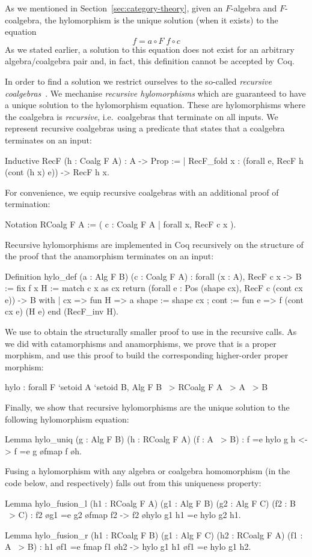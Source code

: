 \documentclass[a4paper,UKenglish,cleveref, autoref, thm-restate]{lipics-v2021}
\begin{document}
As we mentioned in Section~\ref{sec:category-theory}, given an $F$-algebra and
$F$-coalgebra, the hylomorphism is the unique solution (when it exists) to the
equation
\[
  f = a \circ F\; f \circ c
\]
As we stated earlier, a solution to this equation does not exist for an
arbitrary  algebra/coalgebra pair and, in fact, this definition cannot be
accepted by Coq.

In order to find a solution we restrict ourselves to the so-called
\emph{recursive coalgebras}~\cite{AdamekMM19,CaprettaUV04}.  We mechanise
\emph{recursive hylomorphisms} which are guaranteed to have a unique solution to
the hylomorphism equation. These are hylomorphisms where the coalgebra is
\emph{recursive}, i.e.\ coalgebras that terminate on all inputs. We represent
recursive coalgebras using a predicate that states that a coalgebra terminates
on an input:
\begin{coqcode}
Inductive RecF (h : Coalg F A) : A -> Prop :=
| RecF_fold x : (forall e, RecF h (cont (h x) e)) -> RecF h x.
\end{coqcode}
For convenience, we equip recursive coalgebras with an additional proof of termination:
\begin{coqcode}
Notation RCoalg F A := ({ c : Coalg F A | forall x, RecF c x }).
\end{coqcode}
Recursive hylomorphisms are implemented in Coq recursively on the structure of
the proof that the anamorphism terminates on an input:
\begin{coqcode}
Definition hylo_def (a : Alg F B) (c : Coalg F A) : forall (x : A), RecF c x -> B
  := fix f x H
     := match c x as cx return (forall e : Pos (shape cx), RecF c (cont cx e)) -> B with
        | cx => fun H => a { shape := shape cx ; cont := fun e => f (cont cx e) (H e) }
        end (RecF_inv H).
\end{coqcode}

\noindent
We use  to obtain the structurally smaller proof to use in
the recursive calls.
As we did with catamorphisms and anamorphisms, we
prove that  is a proper morphism, and use this proof to build the
corresponding higher-order proper morphism:
\begin{coqcode}
hylo : forall F `{setoid A} `{setoid B}, Alg F B ~> RCoalg F A ~> A ~> B
\end{coqcode}
Finally, we show that recursive hylomorphisms are the unique solution to the following
hylomorphism equation:
\begin{coqcode}
Lemma hylo_uniq (g : Alg F B) (h : RCoalg F A) (f : A ~> B)
    : f =e hylo g h <-> f =e g \o fmap f \o h.
\end{coqcode}
Fusing a hylomorphism with any algebra or coalgebra homomorphism (in the code
below,  and  respectively) falls out from this uniqueness
property:
\begin{coqcode}
Lemma hylo_fusion_l (h1 : RCoalg F A) (g1 : Alg F B) (g2 : Alg F C) (f2 : B ~> C)
  : f2 \o g1 =e g2 \o fmap f2 -> f2 \o hylo g1 h1 =e hylo g2 h1.

Lemma hylo_fusion_r (h1 : RCoalg F B) (g1 : Alg F C) (h2 : RCoalg F A) (f1 : A ~> B)
  :  h1 \o f1 =e fmap f1 \o h2 -> hylo g1 h1 \o f1 =e hylo g1 h2.
\end{coqcode}
\end{document}
